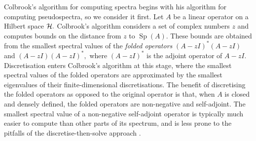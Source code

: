 Colbrook's algorithm for computing spectra begins with his algorithm for computing pseudospectra, so we consider it first.  Let $A$ be a linear operator on a Hilbert space $\mathcal{H}.$
 Colbrook's algorithm considers a set of complex numbers $z$ and computes bounds on the distance from $z$ to $\operatorname{Sp}(A).$ These bounds are obtained from the smallest spectral values of the \textit{folded operators} $(A-zI)^*(A-zI)$ and $(A-zI)(A-zI)^*,$ where $(A-zI)^*$ is the adjoint operator of $A-zI.$ 
 Discretisation enters Colbrook's algorithm at this stage, where the smallest spectral values of the folded operators are approximated by the smallest eigenvalues of their finite-dimensional discretisations. The benefit of discretising the folded operators as opposed to the original operator is that, when $A$ is closed and densely defined, the folded operators are non-negative and self-adjoint.
The smallest spectral value of a non-negative self-adjoint operator is typically much easier to compute than other parts of its spectrum, and is less prone to the pitfalls of the discretise-then-solve approach \cite[Section~3.4.1]{Matt}. 




